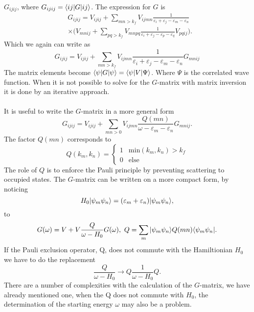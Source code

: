 $G_{ijij}$, where $G_{ijij}=\langle ij|G|ij\rangle$.  The expression for $G$ is
\begin{equation*}
		\begin{split}
				&	G_{ijij}=V_{ijij}+\sum_{mn>k_f}V_{ijmn}\frac{1}{\varepsilon_i+\varepsilon_j-\varepsilon_m-\varepsilon_n}\\
		&		\times \bigg(V_{mnij}+\sum_{pq>k_f}V_{mnpq}\frac{1}{\varepsilon_i+\varepsilon_j-\varepsilon_p-\varepsilon_q}V_{pqij}\bigg).
		\end{split}
\end{equation*}
Which we again can write as
\begin{equation*}
		G_{ijij}=V_{ijij}+\sum_{mn>k_f}V_{ijmn}\frac{1}{\varepsilon_i+\varepsilon_j-\varepsilon_m-\varepsilon_n}G_{mnij}
\end{equation*}
The matrix elements become $\langle \psi|G|\psi\rangle=\langle \psi|V|\Psi\rangle$. Where $\Psi$ is the correlated wave function. When
it is not possible to solve for the $G$-matrix with matrix inversion it is done
by an iterative approach.\\
\\
It is useful to write the $G$-matrix in a more general form 
\begin{equation*}
		G_{ijij}=V_{ijij}+\sum_{mn>0}V_{ijmn}\frac{Q(mn)}{\omega-\varepsilon_m-\varepsilon_n}G_{mnij}.
\end{equation*}
The factor $Q(mn)$ corresponds to
\begin{equation*}
		Q(k_m,k_n)= \begin{cases} 1 & \mbox{min}(k_m,k_n)>k_f\\ 0 & \mbox{else}  \end{cases} 
\end{equation*}
The role of $Q$ is to enforce the Pauli principle by preventing scattering to occupied states. 
The $G$-matrix can be written on a more compact form, by noticing 
\begin{equation*}
		H_0|\psi_m\psi_n\rangle=(\varepsilon_m+\varepsilon_n)|\psi_m\psi_n\rangle,
\end{equation*}
to 
\begin{equation*}
		G(\omega)=V+V\frac{Q}{\omega-H_0}G(\omega),~ Q=\sum_m|\psi_m\psi_n\rangle Q(mn)\langle \psi_m\psi_n|.		
\end{equation*}
If the Pauli exclusion operator, Q, does not commute with the Hamiltionian $H_0$ we have to do the replacement 
\begin{equation*}
		\frac{Q}{\omega-H_0}\rightarrow Q\frac{1}{\omega-H_0}Q.
\end{equation*}
There are a number of complexities with the calculation of the $G$-matrix, we have already mentioned one, when the Q does not commute with $H_0$, the determination of the starting energy $\omega$ may also be a problem.


